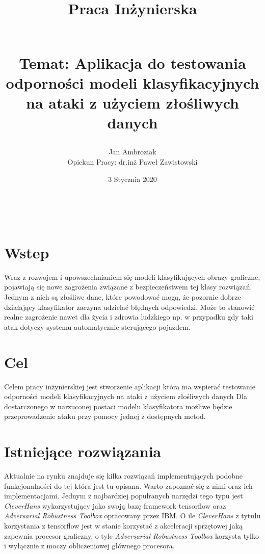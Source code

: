 \documentclass{article}
\title{
    Praca Inżynierska
    \begin{large}
    \\Temat: Aplikacja do testowania odporności
modeli klasyfikacyjnych na ataki z użyciem złośliwych danych
\end{large}}
\date{3 Stycznia 2020}
\author{Jan Ambroziak \\ Opiekun Pracy: dr.inż Paweł Zawistowski}
\begin{document}
    \maketitle

\

\section{Wstep}






Wraz z rozwojem i upowszechnianiem się modeli klasyfikujących obrazy graficzne,
pojawiają się nowe zagrożenia związane z bezpieczeństwem tej klasy rozwiązań.
Jednym z nich są złośliwe dane, które powodować mogą,
że pozornie dobrze działający klasyfikator zaczyna udzielać błędnych odpowiedzi.
Może to stanowić realne zagrożenie nawet dla życia i zdrowia ludzkiego
np. w przypadku gdy taki atak dotyczy systemu automatycznie sterującego pojazdem.

\section{Cel}
\label{sec:target}

Celem pracy inżynierskiej jest stworzenie aplikacji która ma wspierać testowanie
odporności modeli klasyfikacyjnych na ataki z użyciem złośliwych danych
Dla dostarczonego w narzuconej postaci modelu klasyfikatora możliwe będzie
przeprowadzenie ataku przy pomocy jednej z dostępnych metod.

\section{Istniejące rozwiązania}

Aktualnie na rynku znajduje się kilka rozwiązań implementujących podobne funkcjonalności
do tej która jest tu opisana. Warto zapoznać się z nimi oraz ich implementacjami.
Jednym z najbardziej populranych narzędzi tego typu jest \textit{CleverHans}\cite{DBLP:journals/corr/GoodfellowPM16}
wykorzystujący jako swoją bazę framework tensorflow oraz \textit{Adversarial Robustness Toolbox}\cite{DBLP:journals/corr/abs-1807-01069} opracowany przez IBM.
O ile \textit{CleverHans} z tytułu korzystania z tensorflow jest w stanie korzystać z akceleracji sprzętowej jaką zapewnia procesor graficzny, o tyle
\textit{Adversarial Robustness Toolbox} korzysta tylko i wyłącznie z moczy obliczeniowej głównego procesora.
\end{document}
